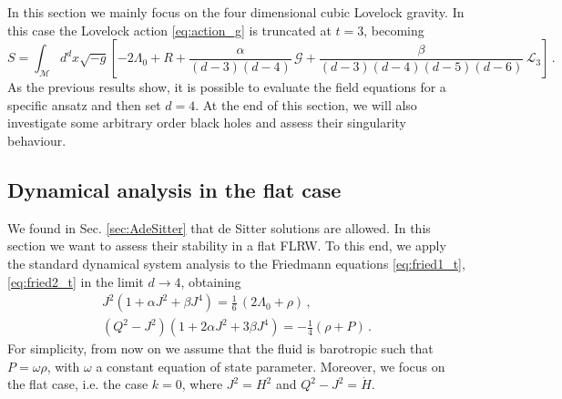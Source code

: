 \documentclass[aps,prd,preprint,nofootinbib]{revtex4-1}
\begin{document}
In this section we mainly focus on the four dimensional cubic Lovelock gravity. In this case the Lovelock action \eqref{eq:action_g} is truncated at $t=3$, becoming
\begin{equation}
\label{eq:action}
S = \int_\mathcal{M} d^d x \sqrt{-g} \left[ -2 \Lambda_0 + R + \frac{\alpha} {(d-3)(d-4)}\,\mathcal{G} + \frac{\beta}{(d-3)(d-4)(d-5)(d-6)} \,\mathcal{L}_3 \right]\,.
\end{equation}
As the previous results show, it is possible to evaluate the field equations for a specific ansatz and then set $d=4$. At the end of this section, we will also investigate some arbitrary order black holes and assess their singularity behaviour.

\subsection{Dynamical analysis in the flat case}\label{sec:acc}

We found in Sec. \ref{sec:AdeSitter} that de Sitter solutions are allowed. In this section we want to assess their stability in a flat FLRW. To this end, we apply the standard dynamical system analysis to the Friedmann equations \eqref{eq:fried1_t}, \eqref{eq:fried2_t} in the limit $d\rightarrow 4$, obtaining
\begin{align}
J^2 \left(1 + \alpha J^2 +  \beta J^4\right) = \frac{1}{6}\, \left(2 \Lambda_0 + \rho\right)\,,\label{eq:friedm1}\\
\left(Q^2-J^2\right) \left(1+2 \alpha J^2 + 3 \beta J^4 \right)= -\frac{1}{4} \left(\rho + P\right)\,.\label{eq:friedm2}
\end{align}
For simplicity, from now on we assume that the fluid is barotropic such that  $P=\omega\rho$, with $\omega$ a constant equation of state parameter. Moreover, we focus on the flat case, i.e. the case $k=0$, where $J^2=H^2$ and $Q^2-J^2 = \dot{H}$.
\end{document}
